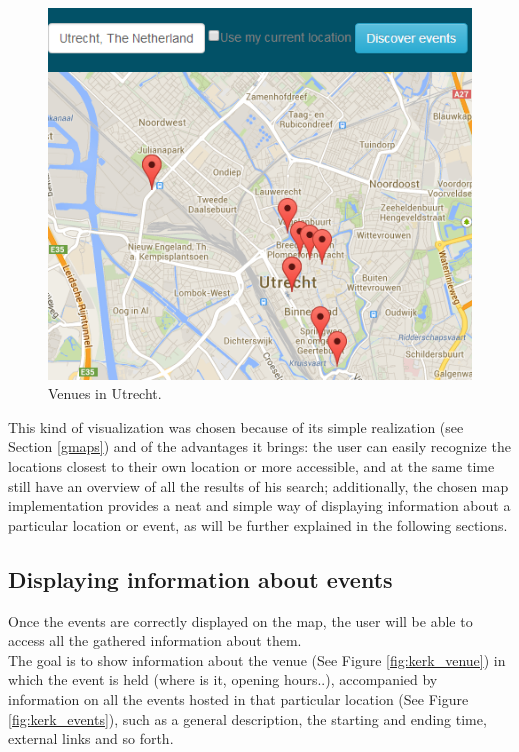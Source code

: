 \documentclass[hidelinks,a4paper]{article}
\begin{document}
\begin{figure}[h!]
  \centering
    \includegraphics[scale=0.48]{images/events_utrecht.png}    
    \caption{Venues in Utrecht.}
    \label{fig:events_utrecht}
\end{figure}

\indent This kind of visualization was chosen because of its simple realization (see Section \ref{gmaps}) and of the advantages it brings: the user can easily recognize the locations closest to their own location or more accessible, and at the same time still have an overview of all the results of his search; additionally, the chosen map implementation provides a neat and simple way of displaying information about a particular location or event, as will be further explained in the following sections.

\subsection{Displaying information about events}\label{infowindow}
Once the events are correctly displayed on the map, the user will be able to access all the gathered information about them.\\
\indent The goal is to show information about the venue (See Figure \ref{fig:kerk_venue}) in which the event is held (where is it, opening hours..), accompanied by information on all the events hosted in that particular location (See Figure \ref{fig:kerk_events}), such as a general description, the starting and ending time, external links and so forth. 
\end{document}
